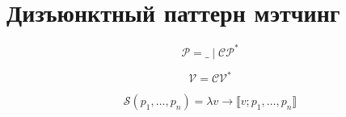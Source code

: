 \documentclass[a5paper,12pt]{article}
\newcommand*{\arr}{\ensuremath{\rightarrow}}
\newcommand{\sem}[1]{\llbracket #1 \rrbracket}
\begin{document}
%
%

\section{Дизъюнктный паттерн мэтчинг}

$$
\mathcal{P = \_ \mid CP^*}
$$

$$
\mathcal{V = CV^*}
$$

$$
\mathcal{S}(p_1,\dots,p_n) = \lambda v \rightarrow \sem{v; p_1,\dots,p_n}
$$
\end{document}
